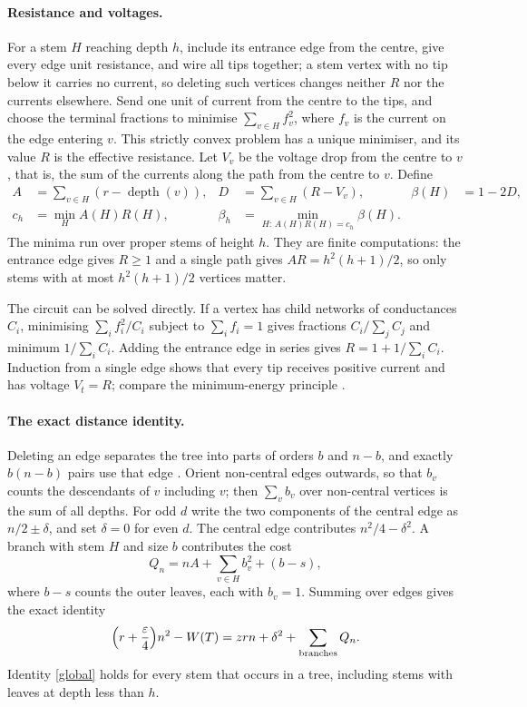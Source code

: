 \documentclass[11pt,a4paper]{article}
\theoremstyle{remark}
\newcommand{\eps}{\varepsilon}
\begin{document}
\paragraph{Resistance and voltages.} For a stem $H$ reaching depth $h$, include its entrance edge from the centre, give every edge unit resistance, and wire all tips together; a stem vertex with no tip below it carries no current, so deleting such vertices changes neither $R$ nor the currents elsewhere. Send one unit of current from the centre to the tips, and choose the terminal fractions to minimise $\sum_{v\in H}f_v^2$, where $f_v$ is the current on the edge entering $v$. This strictly convex problem has a unique minimiser, and its value $R$ is the effective resistance. Let $V_v$ be the voltage drop from the centre to $v$, that is, the sum of the currents along the path from the centre to $v$. Define
\begin{align}
 A&=\sum_{v\in H}(r-\operatorname{depth}(v)),&
 D&=\sum_{v\in H}(R-V_v),&
 \beta(H)&=1-2D, \label{defs}\\
 c_h&=\min_H A(H)R(H),&
 \beta_h&=\min_{H:\,A(H)R(H)=c_h}\beta(H). \label{mins}
\end{align}
The minima run over proper stems of height $h$. They are finite computations: the entrance edge gives $R\ge1$ and a single path gives $AR=h^2(h+1)/2$, so only stems with at most $h^2(h+1)/2$ vertices matter.

The circuit can be solved directly. If a vertex has child networks of conductances $C_i$, minimising $\sum_i f_i^2/C_i$ subject to $\sum_if_i=1$ gives fractions $C_i/\sum_jC_j$ and minimum $1/\sum_iC_i$. Adding the entrance edge in series gives $R=1+1/\sum_iC_i$. Induction from a single edge shows that every tip receives positive current and has voltage $V_t=R$; compare the minimum-energy principle \cite[\S1.3.5]{doyle}.

\paragraph{The exact distance identity.} Deleting an edge separates the tree into parts of orders $b$ and $n-b$, and exactly $b(n-b)$ pairs use that edge \cite{wiener}. Orient non-central edges outwards, so that $b_v$ counts the descendants of $v$ including $v$; then $\sum_vb_v$ over non-central vertices is the sum of all depths. For odd $d$ write the two components of the central edge as $n/2\pm\delta$, and set $\delta=0$ for even $d$. The central edge contributes $n^2/4-\delta^2$. A branch with stem $H$ and size $b$ contributes the cost
\begin{equation}
 Q_n=nA+\sum_{v\in H} b_v^2+(b-s), \label{cost}
\end{equation}
where $b-s$ counts the outer leaves, each with $b_v=1$. Summing over edges gives the exact identity
\begin{equation}
 \Big(r+\frac\eps4\Big)n^2-W(T)=zrn+\delta^2+\sum_{\rm branches} Q_n. \label{global}
\end{equation}
Identity \eqref{global} holds for every stem that occurs in a tree, including stems with leaves at depth less than $h$.
\end{document}
